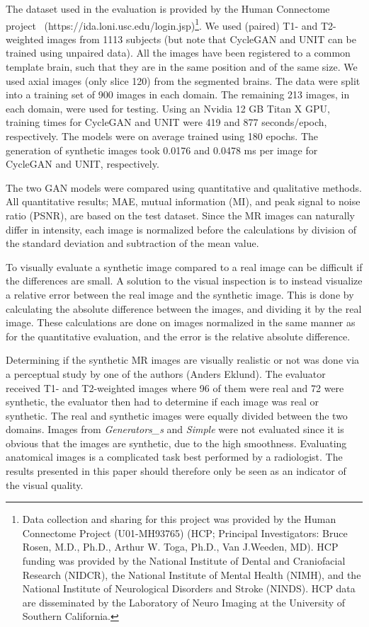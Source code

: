 \documentclass{article}
\begin{document}
The dataset used in the evaluation is provided by the Human Connectome project~\cite{van2013wu,glasser2013} (https://ida.loni.usc.edu/login.jsp)\footnote{Data collection and sharing for this project was provided by the Human Connectome Project (U01-MH93765) (HCP; Principal Investigators: Bruce Rosen, M.D., Ph.D., Arthur W. Toga, Ph.D., Van J.Weeden, MD). HCP funding was provided by the National Institute of Dental and Craniofacial Research (NIDCR), the National Institute of Mental Health (NIMH), and the National Institute of Neurological Disorders and Stroke (NINDS). HCP data are disseminated by the Laboratory of Neuro Imaging at the University of Southern California.}. We used (paired) T1- and T2-weighted images from 1113 subjects (but note that CycleGAN and UNIT can be trained using unpaired data). All the images have been registered to a common template brain, such that they are in the same position and of the same size. We used axial images (only slice 120) from the segmented brains. The data were split into a training set of 900 images in each domain. The remaining 213 images, in each domain, were used for testing. Using an Nvidia 12 GB Titan X GPU, training times for CycleGAN and UNIT were 419 and 877 seconds/epoch, respectively. The models were on average trained using 180 epochs. The generation of synthetic images took 0.0176 and 0.0478 ms per image for CycleGAN and UNIT, respectively.

The two GAN models were compared using quantitative and qualitative methods. All quantitative results; MAE, mutual information (MI), and peak signal to noise ratio (PSNR), are based on the test dataset. Since the MR images can naturally differ in intensity, each image is normalized before the calculations by division of the standard deviation and subtraction of the mean value.

To visually evaluate a synthetic image compared to a real image can be difficult if the differences are small. A solution to the visual inspection is to instead visualize a relative error between the real image and the synthetic image. This is done by calculating the absolute difference between the images, and dividing it by the real image. These calculations are done on images normalized in the same manner as for the quantitative evaluation, and the error is the relative absolute difference.

Determining if the synthetic MR images are visually realistic or not was done via a perceptual study by one of the authors (Anders Eklund). The evaluator received T1- and T2-weighted images where 96 of them were real and 72 were synthetic, the evaluator then had to determine if each image was real or synthetic. The real and synthetic images were equally divided between the two domains. Images from \emph{Generators\_s} and \emph{Simple} were not evaluated since it is obvious that the images are synthetic, due to the high smoothness. Evaluating anatomical images is a complicated task best performed by a radiologist. The results presented in this paper should therefore only be seen as an indicator of the visual quality.
\end{document}
